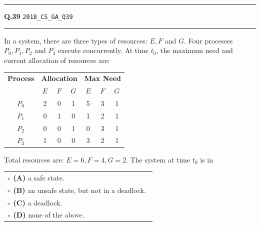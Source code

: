 \documentclass[a4paper,10pt]{article}
\begin{document}
\vspace{6pt}\hrule height 0.35pt\vspace{6pt}
\noindent
\begin{tcolorbox}[
    blanker,
    sidebyside,
    sidebyside align=top,
    lefthand width=0.55\textwidth,
    top=4pt, bottom=4pt, left=0pt, right=0pt,
    middle=16pt,
    underlay={
        \draw[dashed, black!80, line width=0.8pt, dash pattern=on 4pt off 3pt]
            ([xshift=0.55\textwidth+8pt]frame.north west) --
            ([xshift=0.55\textwidth+8pt]frame.south west);
    }
]
\textbf{Q.39}  \hfill {\tiny\texttt{2018\_CS\_GA\_Q39}}
\vspace{2pt}\hrule height 0.3pt\vspace{4pt}

In a system, there are three types of resources: $E, F$ and $G$. Four processes $P_0, P_1, P_2$ and $P_3$ execute concurrently. At time $t_0$, the maximum need and current allocation of resources are:
\begin{center}
\begin{tabular}{c|ccc|ccc}
\textbf{Process} & \multicolumn{3}{c|}{\textbf{Allocation}} & \multicolumn{3}{c}{\textbf{Max Need}} \\
& $E$ & $F$ & $G$ & $E$ & $F$ & $G$ \\
\hline
$P_0$ & 2 & 0 & 1 & 5 & 3 & 1 \\
$P_1$ & 0 & 1 & 0 & 1 & 2 & 1 \\
$P_2$ & 0 & 0 & 1 & 0 & 3 & 1 \\
$P_3$ & 1 & 0 & 0 & 3 & 2 & 1 \\
\end{tabular}
\end{center}
Total resources are: $E = 6, F = 4, G = 2$. The system at time $t_0$ is in

\par\vspace{6pt}\noindent
\begin{tabular}{@{}p{0.98\linewidth}@{}}
$\square$\ \textbf{(A)} a safe state. \\
\addlinespace[3pt]
$\square$\ \textbf{(B)} an unsafe state, but not in a deadlock. \\
\addlinespace[3pt]
$\square$\ \textbf{(C)} a deadlock. \\
\addlinespace[3pt]
$\square$\ \textbf{(D)} none of the above.
\end{tabular}

\tcblower


\end{tcolorbox}
\end{document}
